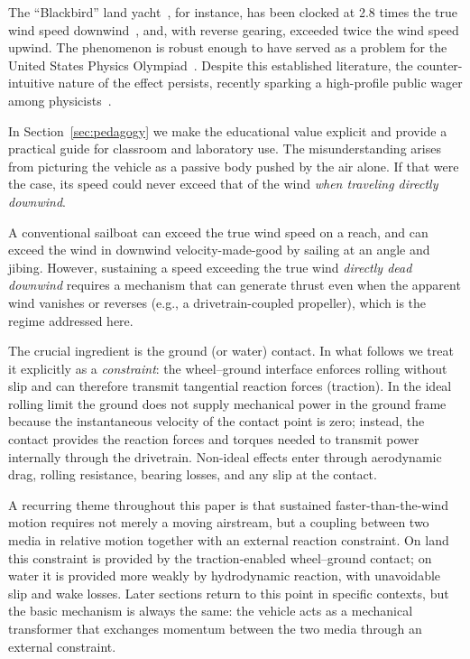 \documentclass[a4paper]{article}
\begin{document}
The ``Blackbird'' land yacht~\cite{nahon-2023}, for instance, has been clocked at 2.8 times the true wind speed downwind~\cite{nalsa2010}, and, with reverse gearing, exceeded twice the wind speed upwind. The phenomenon is robust enough to have served as a problem for the United States Physics Olympiad~\cite{AAPT2013}. Despite this established literature, the counter-intuitive nature of the effect persists, recently sparking a high-profile public wager among physicists~\cite{Veritasium2021}.

In Section~\ref{sec:pedagogy} we make the educational value explicit and provide a practical guide for classroom and laboratory use.
The misunderstanding arises from picturing the vehicle as a passive body pushed by the air alone. If that were the case, its speed could never exceed that of the wind \emph{when traveling directly downwind}.

A conventional sailboat can exceed the true wind speed on a reach, and can exceed the wind in downwind velocity-made-good by sailing at an angle and jibing. However, sustaining a speed exceeding the true wind \emph{directly dead downwind} requires a mechanism that can generate thrust even when the apparent wind vanishes or reverses (e.g., a drivetrain-coupled propeller), which is the regime addressed here.

The crucial ingredient is the ground (or water) contact. In what follows we treat it explicitly as a \emph{constraint}: the wheel--ground interface enforces rolling without slip and can therefore transmit tangential reaction forces (traction). In the ideal rolling limit the ground does not supply mechanical power in the ground frame because the instantaneous velocity of the contact point is zero; instead, the contact provides the reaction forces and torques needed to transmit power internally through the drivetrain. Non-ideal effects enter through aerodynamic drag, rolling resistance, bearing losses, and any slip at the contact.

A recurring theme throughout this paper is that sustained faster-than-the-wind
motion requires not merely a moving airstream, but a coupling between two media
in relative motion together with an external reaction constraint. On land this
constraint is provided by the traction-enabled wheel--ground contact; on water
it is provided more weakly by hydrodynamic reaction, with unavoidable slip and
wake losses. Later sections return to this point in specific contexts, but the
basic mechanism is always the same: the vehicle acts as a mechanical
transformer that exchanges momentum between the two media through an external
constraint.
\end{document}
